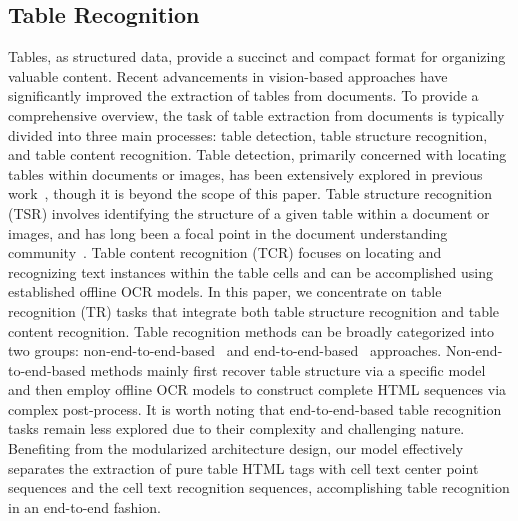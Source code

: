 \subsection{Table Recognition}
Tables, as structured data, provide a succinct and compact format for organizing valuable content. Recent advancements in vision-based approaches have significantly improved the extraction of tables from documents. To provide a comprehensive overview, the task of table extraction from documents is typically divided into three main processes: table detection, table structure recognition, and table content recognition. Table detection, primarily concerned with locating tables within documents or images, has been extensively explored in previous work~\cite{staar2018corpus, zhong2019publaynet}, though it is beyond the scope of this paper. Table structure recognition (TSR) involves identifying the structure of a given table within a document or images, and has long been a focal point in the document understanding community~\cite{gobel2013icdar,gao2019icdar,kayal2021icdar,Raja2020TableSR,liu2021show,GTE}. Table content recognition (TCR) focuses on locating and recognizing text instances within the table cells and can be accomplished using established offline OCR models. In this paper, we concentrate on table recognition (TR) tasks that integrate both table structure recognition and table content recognition. Table recognition methods can be broadly categorized into two groups: non-end-to-end-based~\cite{TableMaster,tableformer,Tsrformer,TRUST,gridformer,VAST} and end-to-end-based~\cite{EDD,ly2023end} approaches. Non-end-to-end-based methods mainly first recover table structure via a specific model and then employ offline OCR models to construct complete HTML sequences via complex post-process. It is worth noting that end-to-end-based table recognition tasks remain less explored due to their complexity and challenging nature. Benefiting from the modularized architecture design, our model effectively separates the extraction of pure table HTML tags with cell text center point sequences and the cell text recognition sequences, accomplishing table recognition in an end-to-end fashion.
    
